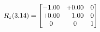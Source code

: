 \documentclass[preview]{standalone}
\begin{document}
\begin{align*}
\special{dvisvgm:raw <g id='unique000'>}R_{z}(3.14) = \begin{bmatrix}-1.00 & +0.00 & 0 \\+0.00 & -1.00 & 0 \\0 & 0 & 1\end{bmatrix}\special{dvisvgm:raw </g>}
\end{align*}
\end{document}
